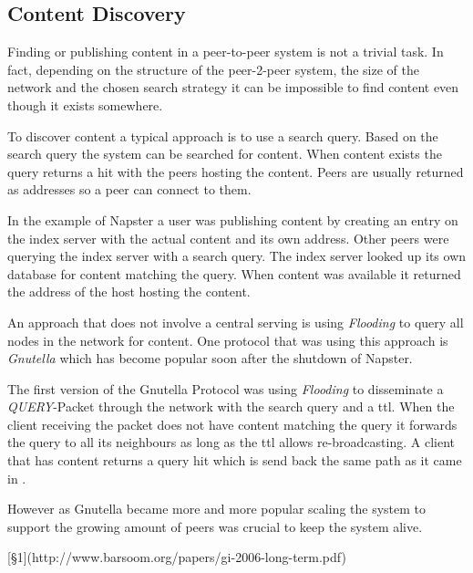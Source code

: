 \subsection{Content Discovery}
Finding or publishing content in a peer-to-peer system is not a trivial task. In fact, depending on the structure of the peer-2-peer system, the size of the network and the chosen search strategy it can be impossible to find content even though it exists somewhere.

To discover content a typical approach is to use a search query. Based on the search query the system can be searched for content. When content exists the query returns a hit with the peers hosting the content. Peers are usually returned as addresses so a peer can connect to them.

In the example of Napster a user was publishing content by creating an entry on the index server with the actual content and its own address. Other peers were querying the index server with a search query. The index server looked up its own database for content matching the query. When content was available it returned the address of the host hosting the content. 

An approach that does not involve a central serving is using \textit{Flooding} to query all nodes in the network for content. One protocol that was using this approach is \textit{Gnutella} which has become popular soon after the shutdown of Napster.

The first version of the Gnutella Protocol was using \textit{Flooding} to disseminate a \textit{QUERY}-Packet through the network with the search query and a \gls{ttl}. When the client receiving the packet does not have content matching the query it forwards the query to all its neighbours as long as the \gls{ttl} allows re-broadcasting. A client that has content returns a query hit which is send back the same path as it came in \cite[\S4]{gnutella04}.

However as Gnutella became more and more popular scaling the system to support the growing amount of peers was crucial to keep the system alive.  \cite[\S3.1]{gnutellaAnalysis}

[\S1](http://www.barsoom.org/papers/gi-2006-long-term.pdf)


